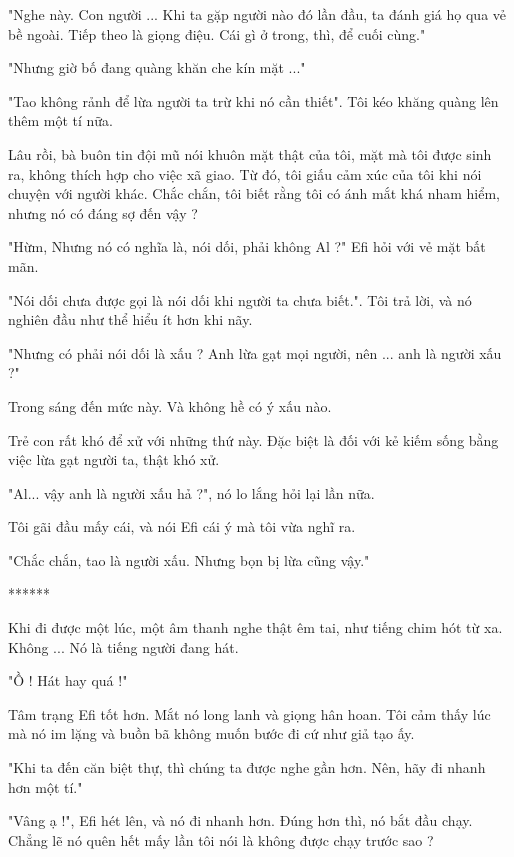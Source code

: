 "Nghe này. Con người ... Khi ta gặp người nào đó lần đầu, ta đánh giá họ qua vẻ bề ngoài. Tiếp theo là giọng điệu. Cái gì ở trong, thì, để cuối cùng."

"Nhưng giờ bố đang quàng khăn che kín mặt ..."

"Tao không rảnh để lừa người ta trừ khi nó cần thiết". Tôi kéo khăng quàng lên thêm một tí nữa.

Lâu rồi, bà buôn tin đội mũ nói khuôn mặt thật của tôi, mặt mà tôi được sinh ra, không thích hợp cho việc xã giao. Từ đó, tôi giấu cảm xúc của tôi khi nói chuyện với người khác. Chắc chắn, tôi biết rằng tôi có ánh mắt khá nham hiểm, nhưng nó có đáng sợ đến vậy ?

"Hừm, Nhưng nó có nghĩa là, nói dối, phải không Al ?" Efi hỏi với vẻ mặt bất mãn.

"Nói dối chưa được gọi là nói dối khi người ta chưa biết.". Tôi trả lời, và nó nghiên đầu như thể hiểu ít hơn khi nãy.

"Nhưng có phải nói dối là xấu ? Anh lừa gạt mọi người, nên ... anh là người xấu ?"

Trong sáng đến mức này. Và không hề có ý xấu nào.

Trẻ con rất khó để xử với những thứ này. Đặc biệt là đối với kẻ kiếm sống bằng việc lừa gạt người ta, thật khó xử.

"Al... vậy anh là người xấu hả ?", nó lo lắng hỏi lại lần nữa.

Tôi gãi đầu mấy cái, và nói Efi cái ý mà tôi vừa nghĩ ra.

"Chắc chắn, tao là người xấu. Nhưng bọn bị lừa cũng vậy."\\

\begin{center}
	******
\end{center}


Khi đi được một lúc, một âm thanh nghe thật êm tai, như tiếng chim hót từ xa. Không ... Nó là tiếng người đang hát.

"Ồ ! Hát hay quá !"

Tâm trạng Efi tốt hơn. Mắt nó long lanh và giọng hân hoan. Tôi cảm thấy lúc mà nó im lặng và buồn bã không muốn bước đi cứ như giả tạo ấy.

"Khi ta đến căn biệt thự, thì chúng ta được nghe gần hơn. Nên, hãy đi nhanh hơn một tí."

"Vâng ạ !", Efi hét lên, và nó đi nhanh hơn. Đúng hơn thì, nó bắt đầu chạy. Chẳng lẽ nó quên hết mấy lần tôi nói là không được chạy trước sao ?

